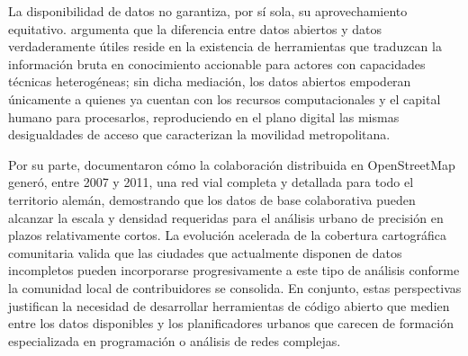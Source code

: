 \label{subsec:datos-comunidad-equidad}
La disponibilidad de datos no garantiza, por sí sola, su aprovechamiento
equitativo. \citet{gurstein2011open} argumenta que la diferencia entre datos
abiertos y datos verdaderamente útiles reside en la existencia de herramientas
que traduzcan la información bruta en conocimiento accionable para actores con
capacidades técnicas heterogéneas; sin dicha mediación, los datos abiertos
empoderan únicamente a quienes ya cuentan con los recursos computacionales y el
capital humano para procesarlos, reproduciendo en el plano digital las mismas
desigualdades de acceso que caracterizan la movilidad metropolitana.

Por su parte, \citet{neis2012street} documentaron cómo la colaboración
distribuida en OpenStreetMap generó, entre 2007 y 2011, una red vial completa y
detallada para todo el territorio alemán, demostrando que los datos \gis{} de
base colaborativa pueden alcanzar la escala y densidad requeridas para el
análisis urbano de precisión en plazos relativamente cortos. La evolución
acelerada de la cobertura cartográfica comunitaria valida que las ciudades que
actualmente disponen de datos incompletos pueden incorporarse progresivamente a
este tipo de análisis conforme la comunidad local de contribuidores se
consolida. En conjunto, estas perspectivas justifican la necesidad de
desarrollar herramientas de código abierto que medien entre los datos
disponibles y los planificadores urbanos que carecen de formación especializada
en programación o análisis de redes complejas.
